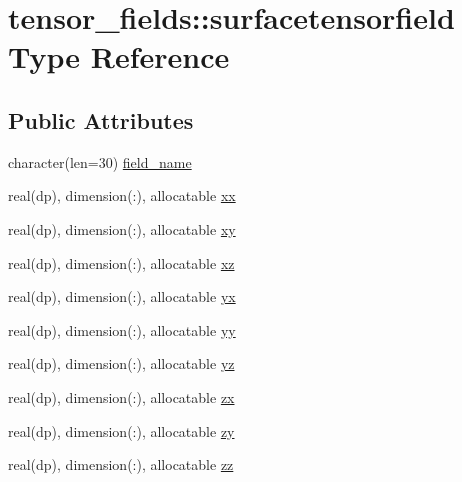 \hypertarget{structtensor__fields_1_1surfacetensorfield}{\section{tensor\-\_\-fields\-:\-:surfacetensorfield Type Reference}
\label{structtensor__fields_1_1surfacetensorfield}
}
\subsection*{Public Attributes}
\begin{DoxyCompactItemize}
\item 
character(len=30) \hyperlink{structtensor__fields_1_1surfacetensorfield_a6241fa2dbe9213be9513224867e692c9}{field\-\_\-name}
\item 
real(dp), dimension(\-:), allocatable \hyperlink{structtensor__fields_1_1surfacetensorfield_add6ff60aebfd2e917eb58087dad1e7b4}{xx}
\item 
real(dp), dimension(\-:), allocatable \hyperlink{structtensor__fields_1_1surfacetensorfield_ad8d87dfab3bb168804487dca75acce71}{xy}
\item 
real(dp), dimension(\-:), allocatable \hyperlink{structtensor__fields_1_1surfacetensorfield_a8493e4a908b989c835e79e5e5e91133e}{xz}
\item 
real(dp), dimension(\-:), allocatable \hyperlink{structtensor__fields_1_1surfacetensorfield_a28a4a24965d3c1e913e2ea1b5c6e6172}{yx}
\item 
real(dp), dimension(\-:), allocatable \hyperlink{structtensor__fields_1_1surfacetensorfield_aa531dbeacc1cad2f0bc0294837759a7d}{yy}
\item 
real(dp), dimension(\-:), allocatable \hyperlink{structtensor__fields_1_1surfacetensorfield_aa12c1018fa60b72d4e698599cd79a8a3}{yz}
\item 
real(dp), dimension(\-:), allocatable \hyperlink{structtensor__fields_1_1surfacetensorfield_abdf93afa6dcb55a9ed270691bbf0fe13}{zx}
\item 
real(dp), dimension(\-:), allocatable \hyperlink{structtensor__fields_1_1surfacetensorfield_a305ae7bb81e4deebe5c6148253bd0d0a}{zy}
\item 
real(dp), dimension(\-:), allocatable \hyperlink{structtensor__fields_1_1surfacetensorfield_abf03f0d86f229b24f77e106becf6ffae}{zz}
\end{DoxyCompactItemize}



